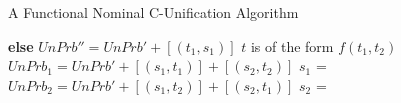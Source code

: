 \begin{frame}[allowframebreaks]{A Functional Nominal C-Unification Algorithm}
\begin{algorithmic}[1]
                \State \textbf{else} 
                    \State \hspace{8 \algorithmicxindent}
                    $UnPrb'' = UnPrb' + [(t_1, s_1)]$ 
                    \State \hspace{8 \algorithmicxindent}
            \Statex\Statex\Statex\Statex
            \Statex\Statex\Statex\Statex
            \Else \Comment $t$ is of the form $f(t_1, t_2)$
                 
                \Else
                    \State $UnPrb_1 = UnPrb' + [(s_1, t_1)] + [(s_2, t_2)]$
                    \State $s_1$ = 
                    \State $UnPrb_2 = UnPrb' + [(s_1, t_2)] + [(s_2, t_1)]$
                    \State $s_2$ = 
                    \State {}
                \Endif
            \Endif
        \Endif
    \Endif
\EndProcedure
\end{algorithmic}
\end{frame}

